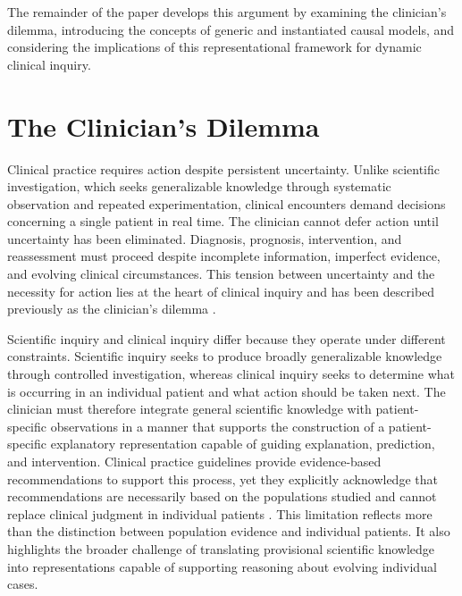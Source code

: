 \documentclass[11pt]{article}
\begin{document}
The remainder of the paper develops this argument by examining the clinician’s dilemma, introducing the concepts of generic and instantiated causal models, and considering the implications of this representational framework for dynamic clinical inquiry.

\section{The Clinician's Dilemma}

Clinical practice requires action despite persistent uncertainty. Unlike scientific investigation, which seeks generalizable knowledge through systematic observation and repeated experimentation, clinical encounters demand decisions concerning a single patient in real time. The clinician cannot defer action until uncertainty has been eliminated. Diagnosis, prognosis, intervention, and reassessment must proceed despite incomplete information, imperfect evidence, and evolving clinical circumstances. This tension between uncertainty and the necessity for action lies at the heart of clinical inquiry and has been described previously as the clinician's dilemma \parencite{collins_synthesis_2018}.

Scientific inquiry and clinical inquiry differ because they operate under different constraints. Scientific inquiry seeks to produce broadly generalizable knowledge through controlled investigation, whereas clinical inquiry seeks to determine what is occurring in an individual patient and what action should be taken next. The clinician must therefore integrate general scientific knowledge with patient-specific observations in a manner that supports the construction of a patient-specific explanatory representation capable of guiding explanation, prediction, and intervention. Clinical practice guidelines provide evidence-based recommendations to support this process, yet they explicitly acknowledge that recommendations are necessarily based on the populations studied and cannot replace clinical judgment in individual patients \parencite{shoemaker_physical_2020}. This limitation reflects more than the distinction between population evidence and individual patients. It also highlights the broader challenge of translating provisional scientific knowledge into representations capable of supporting reasoning about evolving individual cases.
\end{document}
